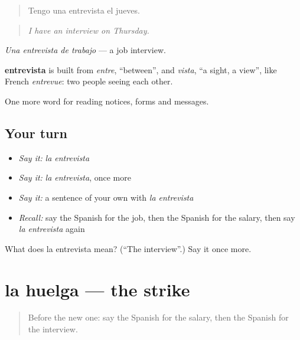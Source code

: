 \begin{quote}
Tengo una entrevista el jueves.
\end{quote}

\begin{quote}
\emph{I have an interview on Thursday.}
\end{quote}

\emph{Una entrevista de trabajo} — a job interview.

\begin{cousinweb}
\textbf{entrevista} is built from \emph{entre}, \textquotedblleft{}between\textquotedblright{}, and \emph{vista}, \textquotedblleft{}a sight, a view\textquotedblright{}, like French \emph{entrevue}: two people seeing each other.
\end{cousinweb}

\begin{grammarlens}[title={What you've built}]
One more word for reading notices, forms and messages.
\end{grammarlens}

\subsection*{Your turn}
\begin{itemize}
\raggedright
  \item \emph{Say it:} \emph{la entrevista}
  \item \emph{Say it:} \emph{la entrevista}, once more
  \item \emph{Say it:} a sentence of your own with \emph{la entrevista}
  \item \emph{Recall:} say the Spanish for the job, then the Spanish for the salary, then say \emph{la entrevista} again
\end{itemize}

\begin{tcolorbox}[breakable,colback=teal!4,colframe=teal!35!black,title={Before you move on}]
What does la entrevista mean? (\textquotedblleft{}The interview\textquotedblright{}.) Say it once more.
\end{tcolorbox}
\section[la huelga]{la huelga — the strike}

\label{lesson:ES-C490-huelga}



\begin{quote}
Before the new one: say the Spanish for the salary, then the Spanish for the interview.
\end{quote}


